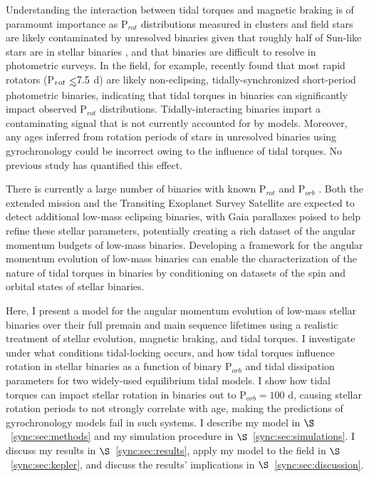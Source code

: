 Understanding the interaction between tidal torques and magnetic braking is of paramount importance as P$_{rot}$ distributions measured in clusters \citep[e.g. Praesepe, ][]{Agueros2011,Douglas2017} and field stars \citep[e.g. \kepler, ][]{Reinhold2013,McQuillan2014} are likely contaminated by unresolved binaries given that roughly half of Sun-like stars are in stellar binaries \citep{Raghavan2010,Duchene2013}, and that binaries are difficult to resolve in photometric surveys. In the \kepler field, for example, \citet{Simonian2018} recently found that most rapid rotators (P$_{rot} \lsim 7.5$ d) are likely non-eclipsing, tidally-synchronized short-period photometric binaries, indicating that tidal torques in binaries can significantly impact observed P$_{rot}$ distributions.  Tidally-interacting binaries impart a contaminating signal that is not currently accounted for by models. Moreover, any ages inferred from rotation periods of stars in unresolved binaries using gyrochronology could be incorrect owing to the influence of tidal torques. No previous study has quantified this effect. 

There is currently a large number of \kepler binaries with known P$_{rot}$ and P$_{orb}$ \citep[e.g.][]{Lurie2017}. Both the extended \kepler mission \citep[K2,][]{Howell2014} and the Transiting Exoplanet Survey Satellite \citep[TESS, ][]{Ricker2014,Sullivan2015} are expected to detect additional low-mass eclipsing binaries, with Gaia parallaxes \citep{Gaia2016} poised to help refine these stellar parameters, potentially creating a rich dataset of the angular momentum budgets of low-mass binaries. Developing a framework for the angular momentum evolution of low-mass binaries can enable the characterization of the nature of tidal torques in binaries by conditioning on datasets of the spin and orbital states of stellar binaries.

Here, I present a model for the angular momentum evolution of low-mass stellar binaries over their full premain and main sequence lifetimes using a realistic treatment of stellar evolution, magnetic braking, and tidal torques. I investigate under what conditions tidal-locking occurs, and how tidal torques influence rotation in stellar binaries as a function of binary P$_{orb}$ and tidal dissipation parameters for two widely-used equilibrium tidal models.  I show how tidal torques can impact stellar rotation in binaries out to P$_{orb} = 100$ d, causing stellar rotation periods to not strongly correlate with age, making the predictions of gyrochronology models fail in such systems.  I describe my model in $\S$~\ref{sync:sec:methods} and my simulation procedure in $\S$~\ref{sync:sec:simulations}.  I discuss my results in $\S$~\ref{sync:sec:results}, apply my model to the \kepler field in $\S$~\ref{sync:sec:kepler}, and discuss the results' implications in $\S$~\ref{sync:sec:discussion}.

